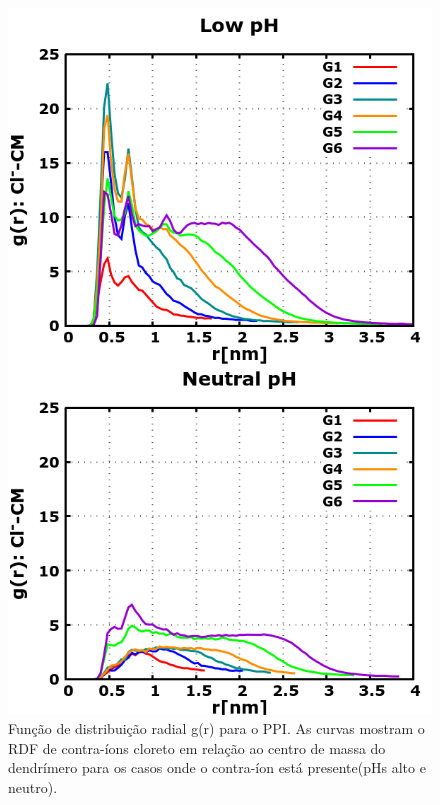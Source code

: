 \begin{figure}[ht!]
\centering
\includegraphics[scale=0.3]{images/PPIClRDF.png}
\caption{Função de distribuição radial g(r) para o PPI. As curvas mostram o RDF de contra-íons cloreto em relação ao centro de massa do dendrímero para os casos onde o contra-íon está presente(pHs alto e neutro).}
\label{fig:PPIClRDF}
\end{figure}


\pagebreak
